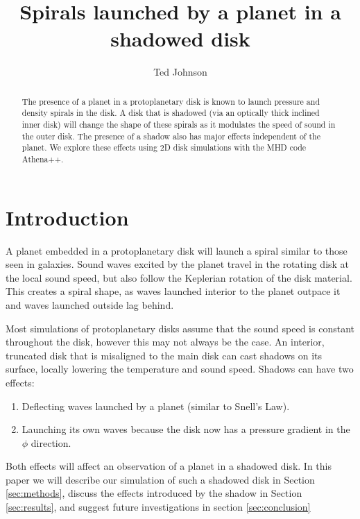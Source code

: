 \documentclass[twocolumn]{aastex631}
\begin{document}
\title{Spirals launched by a planet in a shadowed disk}

\author{Ted Johnson}

\newcommand{\mpl}{10^{-5}}

\begin{abstract}
    The presence of a planet in a protoplanetary disk is known to launch pressure and
    density spirals in the disk. A disk that is shadowed (via an optically thick inclined inner disk)
    will change the shape of these spirals as it modulates the speed of sound in the outer disk. The presence of a 
    shadow also has major effects independent of the planet. We explore these effects using 2D disk simulations with
    the MHD code Athena++.
\end{abstract}

\section{Introduction}
\label{sec:intro}

A planet embedded in a protoplanetary disk will launch a spiral similar to those seen in galaxies.
Sound waves excited by the planet travel in the rotating disk at the local sound speed, but also follow
the Keplerian rotation of the disk material. This creates a spiral shape, as waves launched interior to
the planet outpace it and waves launched outside lag behind.

Most simulations of protoplanetary disks assume that the sound speed is constant throughout the disk,
however this may not always be the case. An interior, truncated disk that is misaligned to the main disk can
cast shadows on its surface, locally lowering the temperature and sound speed. Shadows can have two effects:
\begin{enumerate}
    \item Deflecting waves launched by a planet (similar to Snell's Law).
    \item Launching its own waves because the disk now has a pressure gradient in the $\phi$ direction.
\end{enumerate}

Both effects will affect an observation of a planet in a shadowed disk. In this paper we will describe our simulation
of such a shadowed disk in Section \ref{sec:methods}, discuss the effects introduced by the shadow in Section \ref{sec:results},
and suggest future investigations in section \ref{sec:conclusion}
\end{document}

